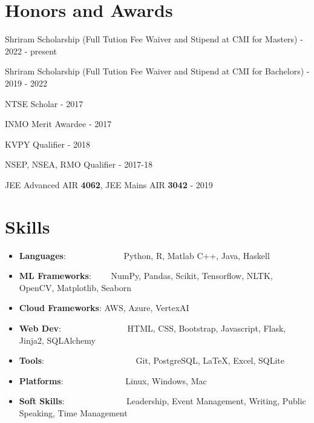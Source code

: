 \documentclass[a4paper,20pt]{article}
\newcommand{\resumeItem}[2]{
  \item\small{
    \textbf{#1}{: #2 \vspace{-2pt}}
  }
}
\newcommand{\resumeSubItem}[2]{\resumeItem{#1}{#2}\vspace{-3pt}}
\newcommand{\resumeSubHeadingListStart}{\begin{itemize}[leftmargin=*]}
\newcommand{\resumeSubHeadingListEnd}{\end{itemize}}
\begin{document}
\section{Honors and Awards}
\begin{description}[font=$\bullet$]
\item {Shriram Scholarship (Full Tution Fee Waiver and Stipend at CMI for Masters) - 2022 - present}
\vspace{-5pt}
\item {Shriram Scholarship (Full Tution Fee Waiver and Stipend at CMI for Bachelors) - 2019 - 2022}
\vspace{-5pt}
\item {NTSE Scholar - 2017}
\vspace{-5pt}
\item {INMO Merit Awardee - 2017 }
\vspace{-5pt}
\item {KVPY Qualifier - 2018}
\vspace{-5pt}
\item {NSEP, NSEA, RMO Qualifier - 2017-18}
\vspace{-5pt}
\item {JEE Advanced AIR \textbf{4062}, JEE Mains AIR \textbf{3042}  - 2019}

\end{description}
\vspace{-5pt}

\section{Skills}
	\resumeSubHeadingListStart
	\resumeSubItem{Languages}{~~~~~~~~~~~~~Python, R, Matlab C++, Java, Haskell}
	\resumeSubItem{ML Frameworks}{~~~~NumPy, Pandas, Scikit, Tensorflow, NLTK, OpenCV, Matplotlib, Seaborn}
  \resumeSubItem{Cloud Frameworks}{AWS, Azure, VertexAI}
	\resumeSubItem{Web Dev}{~~~~~~~~~~~~~~~HTML, CSS, Bootstrap, Javascript, Flask, Jinja2, SQLAlchemy}
	\resumeSubItem{Tools}{~~~~~~~~~~~~~~~~~~~~~Git, PostgreSQL, \LaTeX, Excel, SQLite}
	\resumeSubItem{Platforms}{~~~~~~~~~~~~~~Linux, Windows, Mac}
	\resumeSubItem{Soft Skills}{~~~~~~~~~~~~~~Leadership, Event Management, Writing, Public Speaking, Time Management}

\resumeSubHeadingListEnd
\vspace{-5pt}
\end{document}
